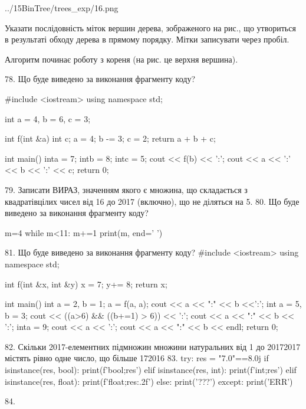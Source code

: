 \documentclass[11pt]{article}
\begin{document}
{{\begin{center}
	{../15BinTree/trees_exp/16.png}
\end{center}
Указати послідовність міток вершин дерева, зображеного на рис., що утвориться в результаті обходу дерева в прямому порядку. Мітки записувати через пробіл.\par Алгоритм починає роботу з кореня (на рис. це верхня вершина).

78. Що буде виведено за виконання фрагменту коду?

#include <iostream>
using namespace std;

int a = 4, b = 6, c = 3;

int f(int &a){
int c;    a = 4;
    b -= 3;
    c = 2;
    return a + b + c;
}

int main(){
    inta = 7;
    intb = 8;
    intc = 5;
    cout << f(b) << ':';
    cout << a << ':' << b << ':' << c;
    return 0; 
}

79. 
Записати ВИРАЗ, значенням якого є множина, що складається з квадратівцілих чисел від 16 до 2017 (включно), що не діляться на 5.
80. Що буде виведено за виконання фрагменту коду?

m=4
while m<11:
    m+=1
print(m, end=' ')


81. Що буде виведено за виконання фрагменту коду?
#include <iostream>
using namespace std;

int f(int &x, int &y){
    x = 7;
    y+= 8;
    return x;
}

int main(){
    int a = 2, b = 1;
    a = f(a, a);
    cout << a << ":" << b <<':';
    {
        int a = 5, b = 3;
        cout << ((a>6) && ((b+=1) > 6)) << ':';
        cout << a << ":" << b << ':';
    }
    {
        inta = 9;
        cout << a << ':';
    }
    cout << a << ":" << b << endl;
    return 0;
}


82. 
Скільки 2017-елементних підмножин множини натуральних від 1 до 20172017 містять рівно одне число, що більше 172016
83. 
try:
    res = "7.0"==8.0j
    if isinstance(res, bool):
        print(f'bool;{res}')
    elif isinstance(res, int):
        print(f'int;{res}')
    elif isinstance(res, float):
        print(f'float;{res:.2f}')
    else:
        print('???')
except:
    print('ERR')

84. 

}}
\end{document}
